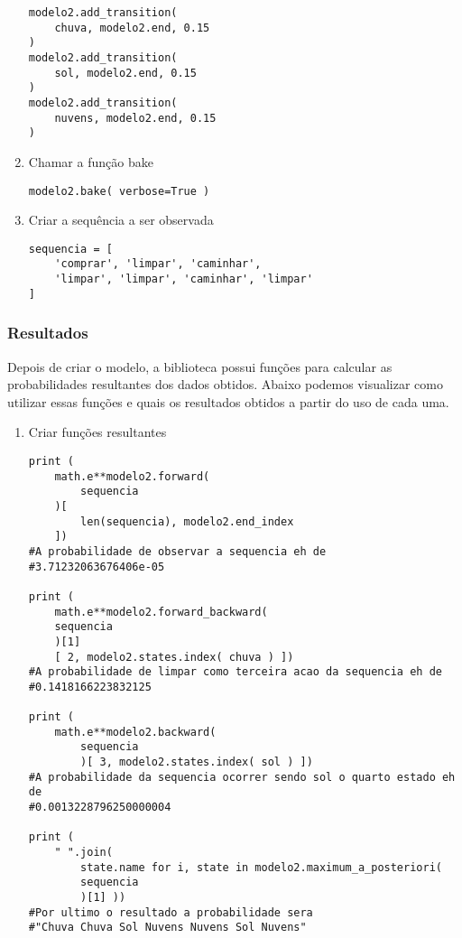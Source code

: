 \documentclass{article}
\begin{document}
\begin{enumerate}
\begin{verbatim}
modelo2.add_transition(
    chuva, modelo2.end, 0.15
)
modelo2.add_transition(
    sol, modelo2.end, 0.15 
)
modelo2.add_transition(
    nuvens, modelo2.end, 0.15 
)
\end{verbatim}

\item Chamar a função bake
\begin{verbatim}
modelo2.bake( verbose=True )
\end{verbatim}

\item Criar a sequência a ser observada
\begin{verbatim}
sequencia = [
    'comprar', 'limpar', 'caminhar', 
    'limpar', 'limpar', 'caminhar', 'limpar'
]
\end{verbatim}

\end{enumerate}
 
 
\subsubsection{Resultados}
Depois de criar o modelo, a biblioteca possui funções para calcular as probabilidades resultantes dos dados obtidos. Abaixo podemos visualizar como utilizar essas funções e quais os resultados obtidos a partir do uso de cada uma.

\begin{enumerate}
    
\item Criar funções resultantes
\begin{verbatim}
print (
    math.e**modelo2.forward(
        sequencia 
    )[ 
        len(sequencia), modelo2.end_index 
    ]) 
#A probabilidade de observar a sequencia eh de
#3.71232063676406e-05

print (
    math.e**modelo2.forward_backward(
    sequencia 
    )[1]
    [ 2, modelo2.states.index( chuva ) ]) 
#A probabilidade de limpar como terceira acao da sequencia eh de 
#0.1418166223832125

print (
    math.e**modelo2.backward( 
        sequencia 
        )[ 3, modelo2.states.index( sol ) ]) 
#A probabilidade da sequencia ocorrer sendo sol o quarto estado eh de 
#0.0013228796250000004

print (
    " ".join(
        state.name for i, state in modelo2.maximum_a_posteriori( 
        sequencia 
        )[1] )) 
#Por ultimo o resultado a probabilidade sera 
#"Chuva Chuva Sol Nuvens Nuvens Sol Nuvens"  
\end{verbatim}

\end{enumerate}
 
\end{document}

